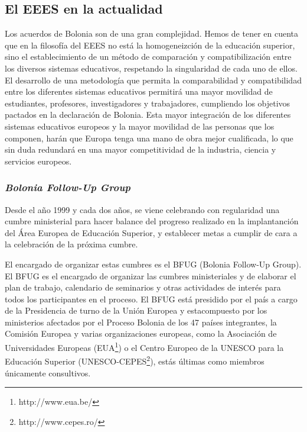 	\subsection{El EEES en la actualidad}
    
	Los acuerdos de Bolonia son de una gran complejidad. Hemos de tener en cuenta que en la filosofía del EEES no está la homogeneizción de la educación superior, sino el establecimiento de un método de comparación y compatibilización entre los diversos sistemas educativos, respetando la singularidad de cada uno de ellos. El desarrollo de una metodología que permita la comparabilidad y compatibilidad entre los diferentes sistemas educativos permitirá una mayor movilidad de estudiantes, profesores, investigadores y trabajadores, cumpliendo los objetivos pactados en la declaración de Bolonia. Esta mayor integración de los diferentes sistemas educativos europeos y la mayor movilidad de las personas que los componen, harán que Europa tenga una mano de obra mejor cualificada, lo que sin duda redundará en una mayor competitividad de la industria, ciencia y servicios europeos.
    
		\subsubsection{\bfseries \itshape Bolonia Follow-Up Group}
    
		Desde el año 1999 y cada dos años, se viene celebrando con regularidad una cumbre ministerial para hacer balance del progreso realizado en la implantanción del Área Europea de Educación Superior, y establecer metas a cumplir de cara a la celebración de la próxima cumbre. 

		El encargado de organizar estas cumbres es el BFUG (Bolonia Follow-Up Group). El BFUG es el encargado de organizar las cumbres ministeriales y de elaborar el plan de trabajo, calendario de seminarios y otras actividades de interés para todos los participantes en el proceso. El BFUG está presidido por el país a cargo de la Presidencia de turno de la Unión Europea y estacompuesto por los ministerios afectados por el Proceso Bolonia de los 47 países integrantes, la Comisión Europea y varias organizaciones europeas, como la Asociación de Universidades Europeas (EUA\footnote{http://www.eua.be/}) o el Centro Europeo de la UNESCO para la Educación Superior (UNESCO-CEPES\footnote{http://www.cepes.ro/}), estás últimas como miembros únicamente consultivos.

